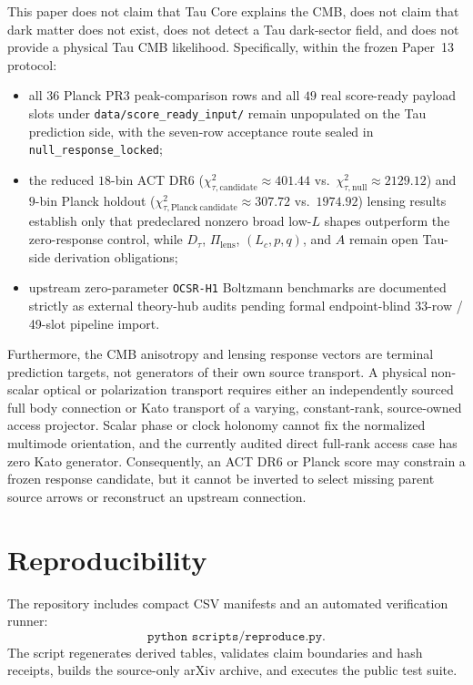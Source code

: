 \documentclass[11pt]{article}
\begin{document}
This paper does not claim that Tau Core explains the CMB, does not claim that
dark matter does not exist, does not detect a Tau dark-sector field, and does
not provide a physical Tau CMB likelihood. Specifically, within the frozen
Paper~13 protocol:
\begin{itemize}[leftmargin=1.8em]
\item all $36$ Planck PR3 peak-comparison rows and all $49$ real score-ready
payload slots under \texttt{data/score\_ready\_input/} remain unpopulated on
the Tau prediction side, with the seven-row acceptance route sealed in
\texttt{null\_response\_locked};
\item the reduced $18$-bin ACT DR6 ($\chi^2_{\tau,\mathrm{candidate}}\approx 401.44$
vs.\ $\chi^2_{\tau,\mathrm{null}}\approx 2129.12$) and $9$-bin Planck
holdout ($\chi^2_{\tau,\mathrm{Planck\ candidate}}\approx 307.72$ vs.\
$1974.92$) lensing results establish only that predeclared nonzero broad
low-$L$ shapes outperform the zero-response control, while $D_\tau$,
$\Pi_{\mathrm{lens}}$, $(L_c,p,q)$, and $A$ remain open Tau-side derivation
obligations;
\item upstream zero-parameter \texttt{OCSR-H1} Boltzmann benchmarks are
documented strictly as external theory-hub audits pending formal endpoint-blind
33-row / 49-slot pipeline import.
\end{itemize}

Furthermore, the CMB anisotropy and lensing response vectors are terminal
prediction targets, not generators of their own source transport. A physical
non-scalar optical or polarization transport requires either an independently
sourced full body connection or Kato transport of a varying, constant-rank,
source-owned access projector. Scalar phase or clock holonomy cannot fix the
normalized multimode orientation, and the currently audited direct full-rank
access case has zero Kato generator. Consequently, an ACT DR6 or Planck score
may constrain a frozen response candidate, but it cannot be inverted to select
missing parent source arrows or reconstruct an upstream connection.

\section{Reproducibility}

The repository includes compact CSV manifests and an automated verification
runner:
\[
\texttt{python scripts/reproduce.py}.
\]
The script regenerates derived tables, validates claim boundaries and hash
receipts, builds the source-only arXiv archive, and executes the public test
suite.
\end{document}
